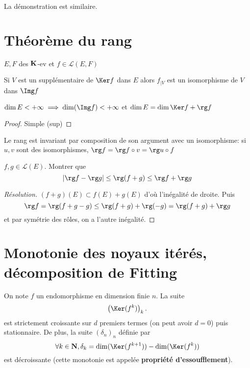  La démonstration est similaire.

 \section{Théorème du rang}

 \begin{thm}
     \Hyp $E, F$ des  $\mathbf K$-ev et $f \in  \mathcal  L(E, F)$
     \begin{concenum}
     \item Si $V$ est un supplémentaire de  $\Ker f$ dans  $E$ alors  $f_{|V}$ est un isomorphisme de $V$ dans  $\Img f$
     \item  $\dim E<+\infty \implies  \dim(\Img f)<+\infty$ et $\dim E=\dim\Ker f+\rg f$
     \end{concenum}
 \end{thm}

 \begin{proof}
     Simple (sup)
 \end{proof}

\begin{rem}
Le rang est invariant par composition de son argument avec un isomorphisme: si $u,v$ sont des isomorphismes,  $\rg f=\rg f\circ v=\rg u\circ f$
\end{rem}

\begin{exo}
    $f,g\in \mathcal  L(E)$. Montrer que \[
        |\rg f-\rg g|\leq \rg(f+g)\leq \rg f+\rg g
    \] 
\end{exo}

\begin{proof}[Résolution]
    $(f+g)(E)\subset f(E)+g(E)$ d'où l'inégalité de droite. Puis  \[
        \rg f = \rg (f+g-g)\leq \rg (f+g)+\rg (-g)=\rg (f+g)+\rg g
    \] 
    et par symétrie des rôles, on a l'autre inégalité.
\end{proof}

\section{Monotonie des noyaux itérés, décomposition de Fitting}

\begin{res}
On note $f$ un endomorphisme en dimension finie $n$. La suite \[
    \left(\Ker(f^k)\right)_k.
\]
est strictement croissante sur $d$ premiers termes (on peut avoir $d=0$) puis stationnaire. De plus, la suite $(\delta_n)_n$ définie par \[
    \forall k\in \N, \delta_k=\dim(\Ker(f^{k+1}))-\dim(\Ker(f^k))
\]
est décroissante (cette monotonie est appelée \textbf{propriété d'essoufflement}).
\end{res}

